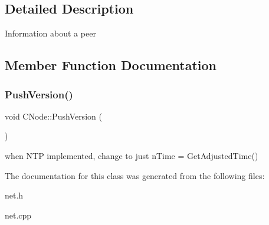 \subsection{Detailed Description}
Information about a peer 

\subsection{Member Function Documentation}
\mbox{\label{class_c_node_a4dbfe4f6c1fd162aaa905e4bd201d536}} 
\subsubsection{\texorpdfstring{PushVersion()}{PushVersion()}}
{\footnotesize\ttfamily void C\+Node\+::\+Push\+Version (\begin{DoxyParamCaption}{ }\end{DoxyParamCaption})}

when N\+TP implemented, change to just n\+Time = Get\+Adjusted\+Time() 

The documentation for this class was generated from the following files\+:\begin{DoxyCompactItemize}
\item 
net.\+h\item 
net.\+cpp\end{DoxyCompactItemize}
